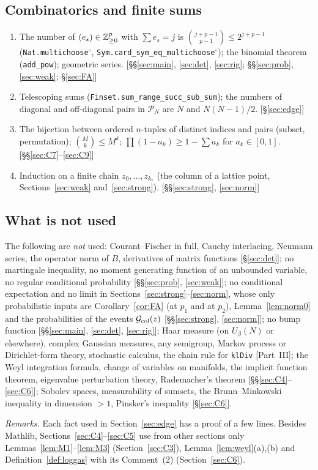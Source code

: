 \subsection{Combinatorics and finite sums}
\begin{enumerate}[leftmargin=2em,itemsep=1pt]\raggedright
\item The number of $(e_s)\in\mathbb{Z}_{\ge0}^p$ with $\sum e_s=j$ is $\binom{j+p-1}{p-1}\le2^{j+p-1}$ (\texttt{Nat.multichoose}$^\circ$, \texttt{Sym.card\_sym\_eq\_multichoose}$^\circ$); the binomial theorem
(\texttt{add\_pow}); geometric series. \hfill[\S\S\ref{sec:main}, \ref{sec:det}, \ref{sec:rig}; \S\S\ref{sec:prob}, \ref{sec:weak}; \S\ref{sec:FA}]
\item Telescoping sums (\texttt{Finset.sum\_range\_succ\_sub\_sum}); the numbers of diagonal and off-diagonal pairs in $\mathcal P_N$ are $N$ and $N(N-1)/2$. \hfill[\S\ref{sec:edge}]
\item The bijection between ordered $n$-tuples of distinct indices and pairs (subset, permutation); $\binom Mk\le M^k$; $\prod(1-a_k)\ge1-\sum a_k$ for $a_k\in[0,1]$. \hfill[\S\S\ref{sec:C7}--\ref{sec:C9}]
\item Induction on a finite chain $z_0,\dots,z_{k_*}$ (the column of a lattice point, Sections~\ref{sec:weak} and~\ref{sec:strong}). \hfill[\S\S\ref{sec:strong}, \ref{sec:norm}]
\end{enumerate}

\subsection{What is not used}
The following are \emph{not} used: Courant--Fischer in full, Cauchy interlacing, Neumann series, the operator norm of $B$, derivatives of matrix functions [\S\ref{sec:det}];
no martingale inequality, no moment generating function of an unbounded variable, no regular conditional probability [\S\S\ref{sec:prob}, \ref{sec:weak}]; no conditional expectation and no limit in Sections~\ref{sec:strong}--\ref{sec:norm},
whose only probabilistic inputs are Corollary~\ref{cor:FA} (at $p_1$ and at $p_2$), Lemma~\ref{lem:norm0} and the probabilities of the events $\mathcal{G}_{\rm col}(z)$ [\S\S\ref{sec:strong}, \ref{sec:norm}]; no bump function [\S\S\ref{sec:main}, \ref{sec:det}, \ref{sec:rig}];
Haar measure (on $U_\beta(N)$ or elsewhere), complex Gaussian measures, any semigroup, Markov process or Dirichlet-form theory, stochastic calculus, the chain rule for \texttt{klDiv} [Part~III];
the Weyl integration formula, change of variables on manifolds, the implicit function theorem, eigenvalue perturbation theory, Rademacher's theorem [\S\S\ref{sec:C4}--\ref{sec:C6}];
Sobolev spaces, measurability of sumsets, the Brunn--Minkowski inequality in dimension $>1$, Pinsker's inequality [\S\ref{sec:C6}].

\noindent\emph{Remarks.} Each fact used in Section~\ref{sec:edge} has a proof of a few lines. Besides Mathlib, Sections~\ref{sec:C4}--\ref{sec:C5} use from other sections only
Lemmas~\ref{lem:M1}--\ref{lem:M3} (Section~\ref{sec:C3}), Lemma~\ref{lem:weyl}(a),(b) and Definition~\ref{def:loggas} with its Comment~(2) (Section~\ref{sec:C6}).
